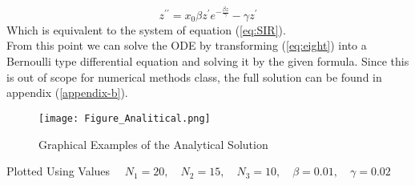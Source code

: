 \begin{equation} \label{eq:eight}
	z^{\prime\prime} = x_{0} \beta z^{\prime} e^{-\frac{\beta z}{\gamma}} - \gamma z^{\prime}
\end{equation}
Which is equivalent to the system of equation (\ref{eq:SIR}). \\
From this point we can solve the ODE by transforming (\ref{eq:eight}) into a Bernoulli type differential equation and solving it
by the given formula. Since this is out of scope for numerical methods class, the full solution can be found in appendix (\ref{appendix-b}).

\pagebreak

\begin{figure}[H]
	\caption{Graphical Examples of the Analytical Solution}
	\centering
	\texttt{[image: Figure\_Analitical.png]}
\end{figure}
Plotted Using Values$\quad$ $N_1=20, \quad N_2=15, \quad N_3=10, \quad \beta = 0.01, \quad \gamma = 0.02$

	

	

